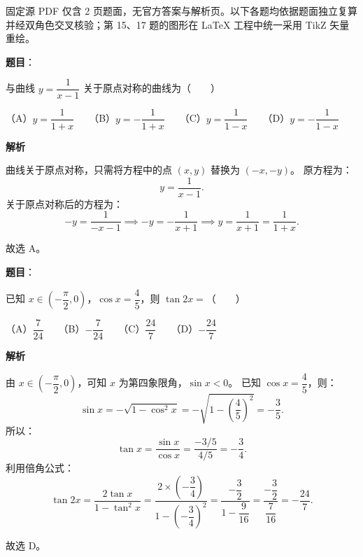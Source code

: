 

\begin{gktip}
固定源 PDF 仅含 2 页题面，无官方答案与解析页。以下各题均依据题面独立复算并经双角色交叉核验；第 15、17 题的图形在 LaTeX 工程中统一采用 TikZ 矢量重绘。
\end{gktip}

\begin{answer}

\textbf{题目}：

与曲线 $y = \dfrac{1}{x-1}$ 关于原点对称的曲线为\mbox{（　　）}

（A）$y = \dfrac{1}{1+x}$　　（B）$y = -\dfrac{1}{1+x}$　　（C）$y = \dfrac{1}{1-x}$　　（D）$y = -\dfrac{1}{1-x}$

\textbf{解析}

曲线关于原点对称，只需将方程中的点 $(x, y)$ 替换为 $(-x, -y)$。
原方程为：
\nopagebreak[4]
\[y = \frac{1}{x - 1}.\]
关于原点对称后的方程为：
\nopagebreak[4]
\[-y = \frac{1}{-x - 1} \implies -y = -\frac{1}{x + 1} \implies y = \frac{1}{x + 1} = \frac{1}{1 + x}.\]

故选 A。


\end{answer}
\begin{answer}

\textbf{题目}：

已知 $x \in \left(-\dfrac{\pi}{2}, 0\right)$，$\cos x = \dfrac{4}{5}$，则 $\tan 2x =$\mbox{（　　）}

（A）$\dfrac{7}{24}$　　（B）$-\dfrac{7}{24}$　　（C）$\dfrac{24}{7}$　　（D）$-\dfrac{24}{7}$

\textbf{解析}

由 $x \in \left(-\dfrac{\pi}{2}, 0\right)$，可知 $x$ 为第四象限角，$\sin x < 0$。
已知 $\cos x = \dfrac{4}{5}$，则：
\nopagebreak[4]
\[\sin x = -\sqrt{1 - \cos^2 x} = -\sqrt{1 - \left(\frac{4}{5}\right)^2} = -\frac{3}{5}.\]
所以：
\nopagebreak[4]
\[\tan x = \frac{\sin x}{\cos x} = \frac{-3/5}{4/5} = -\frac{3}{4}.\]
利用倍角公式：
\nopagebreak[4]
\[\tan 2x = \frac{2\tan x}{1 - \tan^2 x} = \frac{2 \times \left(-\dfrac{3}{4}\right)}{1 - \left(-\dfrac{3}{4}\right)^2} = \frac{-\dfrac{3}{2}}{1 - \dfrac{9}{16}} = \frac{-\dfrac{3}{2}}{\dfrac{7}{16}} = -\frac{24}{7}.\]

故选 D。


\end{answer}
